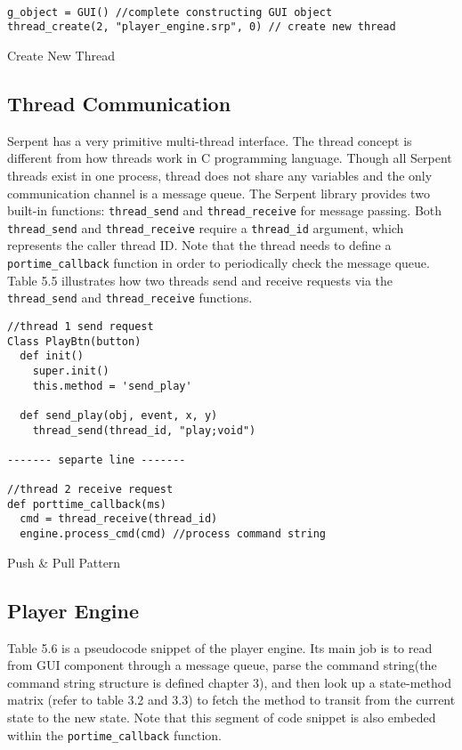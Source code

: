 \begin{table}[htdp]
\centering

\begin{lstlisting}

g_object = GUI() //complete constructing GUI object
thread_create(2, "player_engine.srp", 0) // create new thread

\end{lstlisting}

\caption[Create New Thread]{Create New Thread}
\end{table}

\subsection{Thread Communication}

Serpent has a very primitive multi-thread interface. The thread concept is 
different from how threads work in C programming language. Though all Serpent 
threads exist in one process, thread does not share any variables and the only 
communication channel is a message queue. The Serpent library provides two
built-in functions: \texttt{thread\_send} and \texttt{thread\_receive} 
for message passing. Both \texttt{thread\_send} and \texttt{thread\_receive}
require a \texttt{thread\_id} argument, which represents the caller thread ID. 
Note that the thread needs to define a \texttt{portime\_callback} function
in order to periodically check the message queue. Table 5.5 illustrates how 
two threads send and receive requests via the \texttt{thread\_send} and 
\texttt{thread\_receive} functions.
\begin{table}[htdp]
\centering
\begin{lstlisting}
//thread 1 send request 
Class PlayBtn(button)
  def init()
    super.init()
    this.method = 'send_play'

  def send_play(obj, event, x, y)
    thread_send(thread_id, "play;void")

------- separte line -------

//thread 2 receive request 
def porttime_callback(ms)
  cmd = thread_receive(thread_id)
  engine.process_cmd(cmd) //process command string
\end{lstlisting}
\caption[Push \& Pull Pattern]{Push \& Pull Pattern}
\end{table}

\subsection{Player Engine}
Table 5.6 is a pseudocode snippet of the player engine. Its main job is to read 
from GUI component through a message queue, parse the command string(the  
command string structure is defined chapter 3), and then look up a state-method 
matrix (refer to table 3.2 and 3.3) to fetch the method to transit from the 
current state to the new state. Note that this segment of code snippet is also 
embeded within the \texttt{portime\_callback} function.



